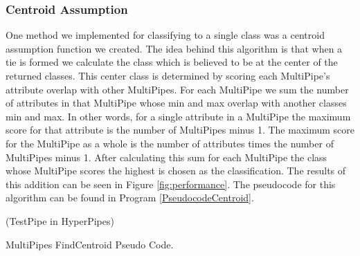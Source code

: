 \subsubsection{Centroid Assumption}
One method we implemented for classifying to a single class was
a centroid assumption function we created. The idea behind this
algorithm is that when a tie is formed we calculate the class 
which is believed to be at the center of the returned classes. 
This center class is determined by scoring each MultiPipe's 
attribute overlap with other MultiPipes. For each MultiPipe we 
sum the number of attributes in that MultiPipe whose min and max 
overlap with another classes min and max. In other words, for a 
single attribute in a MultiPipe the maximum score for that 
attribute is the number of MultiPipes minus 1. The maximum score 
for the MultiPipe as a whole is the number of attributes times 
the number of MultiPipes minus 1. After calculating this sum for 
each MultiPipe the class whose MultiPipe scores the highest 
is chosen as the classification. The results of this addition can 
be seen in Figure \ref{fig:performance}. The pseudocode for this 
algorithm can be found in Program \ref{PseudocodeCentroid}.
\begin{program}
\begin{algorithmic}
\ForAll(TestPipe in HyperPipes)
\EndIf
\EndFor
\EndIf
\EndFor
\EndFor
\EndProcedure
\end{algorithmic}
\caption{MultiPipes FindCentroid Pseudo Code.}\label{PseudocodeCentroid}
\end{program}


